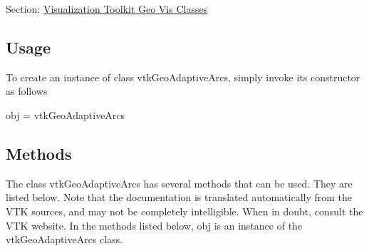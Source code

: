 Section\-: \hyperlink{sec_vtkgeovis}{Visualization Toolkit Geo Vis Classes} \hypertarget{vtkwidgets_vtkxyplotwidget_Usage}{}\subsection{Usage}\label{vtkwidgets_vtkxyplotwidget_Usage}
To create an instance of class vtk\-Geo\-Adaptive\-Arcs, simply invoke its constructor as follows \begin{DoxyVerb}  obj = vtkGeoAdaptiveArcs
\end{DoxyVerb}
 \hypertarget{vtkwidgets_vtkxyplotwidget_Methods}{}\subsection{Methods}\label{vtkwidgets_vtkxyplotwidget_Methods}
The class vtk\-Geo\-Adaptive\-Arcs has several methods that can be used. They are listed below. Note that the documentation is translated automatically from the V\-T\-K sources, and may not be completely intelligible. When in doubt, consult the V\-T\-K website. In the methods listed below, {\ttfamily obj} is an instance of the vtk\-Geo\-Adaptive\-Arcs class. 
